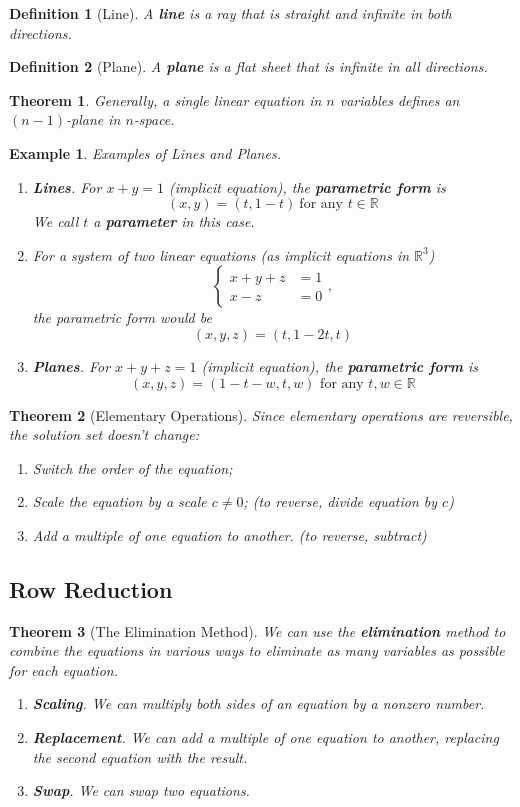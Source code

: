 \documentclass[12pt, a4paper]{article}
\newtheorem{thm}{Theorem}[subsection]
\newtheorem{df}{Definition}[subsection]
\newtheorem{eg}{Example}[subsection]
\def\R{{\mathbb{R}}}
\begin{document}
\begin{df}[Line]
A \textbf{line} is a ray that is \textit{straight} and \textit{infinite} in both directions.
\end{df}
\begin{df}[Plane]
A \textbf{plane} is a flat sheet that is infinite in all directions.
\end{df}
\begin{thm}
Generally, a single linear equation in $n$ variables defines an $(n-1)$-plane in $n$-space. 
\end{thm}

\begin{eg}
Examples of Lines and Planes. \par
\begin{enumerate}
\item \textbf{Lines}. For $x+y=1$ (implicit equation), the \textbf{parametric form} is $$(x,y)=(t, 1-t)\ \text{for any } t \in \R$$
We call $t$ a \textbf{parameter} in this case.
\item For a system of two linear equations (as implicit equations in $\R^3$) $$\left\{\begin{aligned}x+y+z&=1\\x-z&=0\end{aligned}\right., $$ the parametric form would be $$(x,y,z)=(t,1-2t,t)$$
\item \textbf{Planes}. For $x+y+z=1$ (implicit equation), the \textbf{parametric form} is $$(x,y,z)=(1-t-w,t,w) \text{ for any } t,w \in \mathbb{R}$$
\end{enumerate}
\end{eg}

\begin{thm}[Elementary Operations] Since elementary operations are reversible, the solution set doesn't change:
\begin{enumerate}
\item Switch the order of the equation;
\item Scale the equation by a scale $c\neq 0$; (to reverse, divide equation by $c$)
\item Add a multiple of one equation to another. (to reverse, subtract)
\end{enumerate}
\end{thm}

\subsection{Row Reduction}
\begin{thm}[The Elimination Method] We can use the \textbf{elimination} method to combine the equations in various ways to eliminate as many variables as possible for each equation.
\begin{enumerate}
\item \textbf{Scaling}. We can multiply both sides of an equation by a nonzero number. 
\item \textbf{Replacement}. We can add a multiple of one equation to another, replacing the second equation with the result. 
\item \textbf{Swap}. We can swap two equations.
\end{enumerate}
\end{thm}
\end{document}

